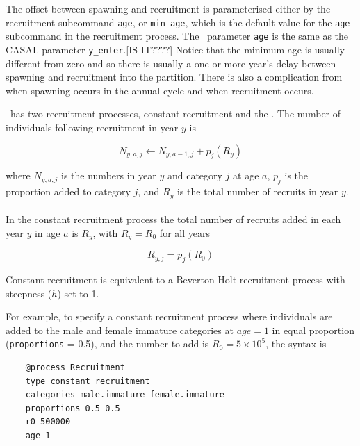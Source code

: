 The offset between spawning and recruitment is parameterised either by the recruitment subcommand \texttt{age}, or \texttt{min\_age}, which is the default value for the \texttt{age} subcommand in the recruitment process. The \CNAME~parameter \texttt{age} is the same as the CASAL parameter \texttt{y\_enter}.[IS IT????] Notice that the minimum age is usually different from zero and so there is usually  a one or more year's delay between spawning and recruitment into the partition. There is also a complication from when spawning occurs in the annual cycle and when recruitment occurs.

\CNAME~has two  recruitment processes, constant recruitment and the  \citep{1203}. The  number of individuals following recruitment in year $y$ is

\begin{equation}
N_{y,a,j} \leftarrow N_{y,a - 1,j} + p_j(R_y)
\end{equation}

where $N_{y,a,j}$ is the numbers in year $y$ and category $j$ at age $a$, $p_j$ is the proportion added to category $j$, and $R_y$ is the total number of recruits in year $y$.

\paragraph{}\label{subsubsec:constant-recruitment}

In the constant recruitment process the total number of recruits added in each year $y$ in age $a$ is $R_y$, with $R_y = R_0$ for all years

\begin{equation}
  R_{y,j} = p_j(R_0)
\end{equation}

Constant recruitment is equivalent to a Beverton-Holt recruitment process with steepness ($h$) set to 1.

For example, to specify a constant recruitment process where individuals are added to the male and female immature categories at $age=1$ in equal proportion (\texttt{proportions} = 0.5), and the number to add is $R_0=5 \times 10^5$, the syntax is

{\small{\begin{verbatim}
	@process Recruitment
	type constant_recruitment
	categories male.immature female.immature
	proportions 0.5 0.5
	r0 500000
	age 1
\end{verbatim}}}

